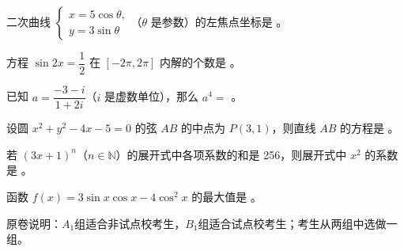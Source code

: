 \begin{question}
二次曲线 $\begin{cases}x=5\cos\theta,\\ y=3\sin\theta\end{cases}$（$\theta$ 是参数）的左焦点坐标是 \gkblank{}。

\end{question}
\begin{question}
方程 $\sin 2x=\dfrac12$ 在 $[-2\pi,2\pi]$ 内解的个数是 \gkblank{}。

\end{question}
\begin{question}
已知 $a=\dfrac{-3-i}{1+2i}$（$i$ 是虚数单位），那么 $a^4=$ \gkblank{}。

\end{question}
\begin{question}
设圆 $x^2+y^2-4x-5=0$ 的弦 $AB$ 的中点为 $P(3,1)$，则直线 $AB$ 的方程是 \gkblank{}。

\end{question}
\begin{question}
若 $(3x+1)^n$（$n\in\mathbb N$）的展开式中各项系数的和是 256，则展开式中 $x^2$ 的系数是 \gkblank{}。

\end{question}
\begin{question}
函数 $f(x)=3\sin x\cos x-4\cos^2x$ 的最大值是 \gkblank{}。

\end{question}

原卷说明：$A_1$组适合非试点校考生，$B_1$组适合试点校考生；考生从两组中选做一组。

